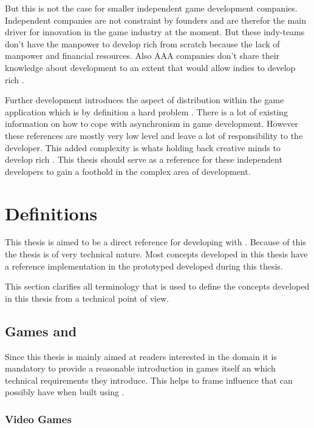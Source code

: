 But this is not the case for smaller independent game development companies.
Independent companies are not constraint by founders and are therefor the main
driver for innovation in the game industry at the moment. But these  indy-teams don't
have the manpower to develop rich \ogs{} from scratch because the lack of
manpower and financial resources. Also AAA companies don't share their knowledge
about \og{} development to an extent that would allow indies to develop rich
\ogs{}.

Further \og{} development introduces the aspect of distribution within the game
application which is by definition a hard problem . There
is a lot of existing information on how to cope with asynchronism in game
development. However these references are mostly very low
level and leave a lot of responsibility to the developer. This added complexity
is whats holding back creative minds to develop rich \ogs{}. This thesis should
serve as a reference for these independent developers to gain a foothold in the
complex area of \og{} development.

\section{Definitions}

This thesis is aimed to be a direct reference for developing \ogs{} with \mss{}.
Because of this the thesis is of very technical nature. Most concepts developed
in this thesis have a reference implementation in the prototyped developed
during this thesis. 

This section clarifies all terminology that is used to define the concepts
developed in this thesis from a technical point of view.

\subsection{Games and \ogs{}}

Since this thesis is mainly aimed at readers interested in the \ms{} domain it
is mandatory to provide a reasonable introduction in games itself an which
technical requirements they introduce. This helps to frame influence that \ogs{}
can possibly have when built using \mss{}.

\subsubsection{Video Games}

